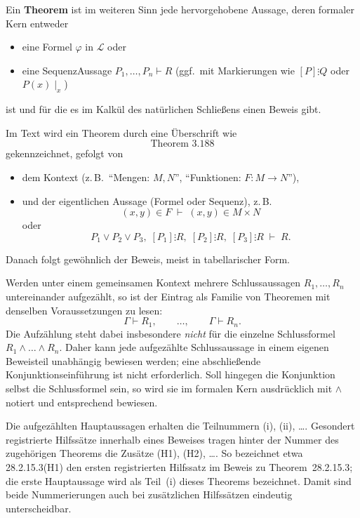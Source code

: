 \documentclass[main.tex]{subfiles}
\begin{document}
\begin{definition}[Theorem]
Ein \textbf{Theorem} ist im weiteren Sinn jede hervorgehobene
Aussage, deren formaler Kern entweder
\begin{itemize}
  \item eine Formel \(\varphi\) in \(\mathcal L\) oder
  \item eine Sequenz\-Aussage \(P_1,\dots,P_n \vdash R\) (ggf.\ mit
        Markierungen wie \([P]\vdots Q\) oder \(P(x)\mid_x\))
\end{itemize}
ist und für die es im Kalkül des natürlichen Schließens einen
Beweis gibt.

Im Text wird ein Theorem durch eine Überschrift wie
\[
  \text{Theorem 3.188}
\]
gekennzeichnet, gefolgt von
\begin{itemize}
  \item dem Kontext (z.\,B.\ \enquote{Mengen:
        \(M,N\)}, \enquote{Funktionen: \(F\colon M\to N\)}),
  \item und der eigentlichen Aussage (Formel oder Sequenz), z.\,B.
        \[
          (x,y)\in F \;\vdash\; (x,y)\in M\times N
        \]
        oder
        \[
          P_1\lor P_2\lor P_3,\; [P_1]\vdots R,\; [P_2]\vdots R,\;
          [P_3]\vdots R \;\vdash\; R.
        \]
\end{itemize}
Danach folgt gewöhnlich der Beweis, meist in tabellarischer Form.
\end{definition}

\begin{remark}
Werden unter einem gemeinsamen Kontext mehrere Schlussaussagen
\(R_1,\dots,R_n\) untereinander aufgezählt, so ist der Eintrag als Familie
von Theoremen mit denselben Voraussetzungen zu lesen:
\[
  \Gamma \vdash R_1,\qquad \dots,\qquad \Gamma \vdash R_n.
\]
Die Aufzählung steht dabei insbesondere \emph{nicht} für die einzelne
Schlussformel \(R_1\land\dots\land R_n\). Daher kann jede aufgezählte
Schlussaussage in einem eigenen Beweisteil unabhängig bewiesen werden; eine
abschließende Konjunktionseinführung ist nicht erforderlich. Soll hingegen
die Konjunktion selbst die Schlussformel sein, so wird sie im formalen Kern
ausdrücklich mit \(\land\) notiert und entsprechend bewiesen.

Die aufgezählten Hauptaussagen erhalten die Teilnummern
\textup{(i)}, \textup{(ii)}, \dots. Gesondert registrierte Hilfssätze
innerhalb eines Beweises tragen hinter der Nummer des zugehörigen
Theorems die Zusätze \textup{(H1)}, \textup{(H2)}, \dots.
So bezeichnet etwa \textup{28.2.15.3(H1)} den ersten registrierten
Hilfssatz im Beweis zu Theorem~\textup{28.2.15.3}; die erste
Hauptaussage wird als Teil~\textup{(i)} dieses Theorems bezeichnet.
Damit sind beide Nummerierungen auch bei zusätzlichen Hilfssätzen
eindeutig unterscheidbar.
\end{remark}
\end{document}
